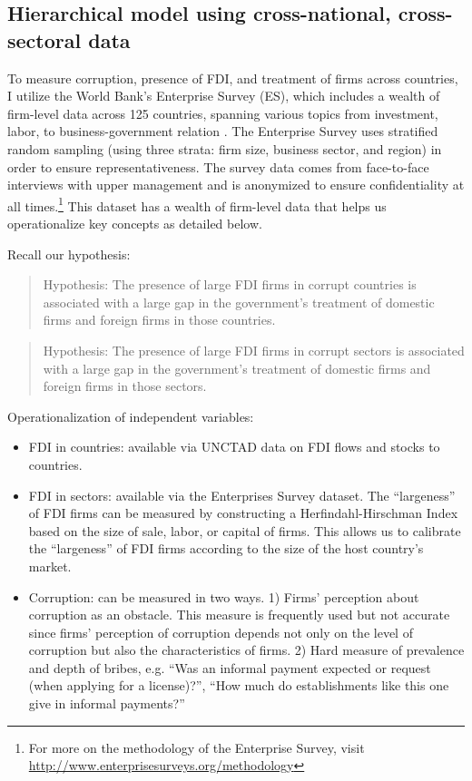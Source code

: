 \subsection{Hierarchical model using cross-national, cross-sectoral data}

To measure corruption, presence of FDI, and treatment of firms across countries, I utilize the World Bank's Enterprise Survey (ES), which includes a wealth of firm-level data across 125 countries, spanning various topics from investment, labor, to business-government relation \citep{WorldBank2015}. The Enterprise Survey uses stratified random sampling (using three strata: firm size, business sector, and region) in order to ensure representativeness. The survey data comes from face-to-face interviews with upper management and is anonymized to ensure confidentiality at all times.\footnote{For more on the methodology of the Enterprise Survey, visit \url{http://www.enterprisesurveys.org/methodology}} This dataset has a wealth of firm-level data that helps us operationalize key concepts as detailed below.

Recall our hypothesis:

\begin{quote}
Hypothesis: The presence of large FDI firms in corrupt countries is associated with a large gap in the government's treatment of domestic firms and foreign firms in those countries.
\end{quote}

\begin{quote}
Hypothesis: The presence of large FDI firms in corrupt sectors is associated with a large gap in the government's treatment of domestic firms and foreign firms in those sectors.
\end{quote}

Operationalization of independent variables:
\begin{itemize}
\item FDI in countries: available via UNCTAD data on FDI flows and stocks to countries.

\item FDI in sectors: available via the Enterprises Survey dataset. The ``largeness'' of FDI firms can be measured by constructing a Herfindahl-Hirschman Index based on the size of sale, labor, or capital of firms. This allows us to calibrate the ``largeness'' of FDI firms according to the size of the host country's market.

\item Corruption: can be measured in two ways. 1) Firms' perception about corruption as an obstacle. This measure is frequently used but not accurate since firms' perception of corruption depends not only on the level of corruption but also the characteristics of firms. 2) Hard measure of prevalence and depth of bribes, e.g. ``Was an informal payment expected or request (when applying for a license)?'', ``How much do establishments like this one give in informal payments?'' 
\end{itemize}

